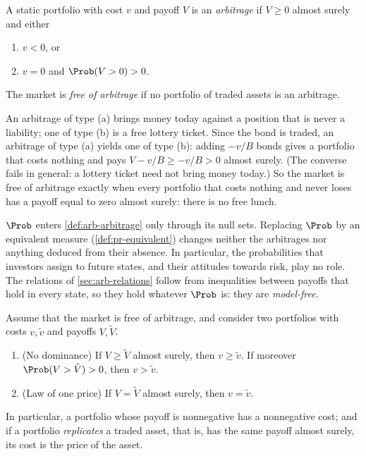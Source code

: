 \begin{definition}[Arbitrage]\label{def:arb-arbitrage}
A static portfolio with cost $v$ and payoff $V$ is an \emph{arbitrage} if $V\ge0$ almost
surely and either
\begin{enumerate}[label=(\alph*)]
  \item $v<0$, or
  \item $v=0$ and $\Prob(V>0)>0$.
\end{enumerate}
The market is \emph{free of arbitrage} if no portfolio of traded assets is an arbitrage.
\end{definition}

An arbitrage of type (a) brings money today against a position that is never a liability;
one of type (b) is a free lottery ticket. Since the bond is traded, an arbitrage of type (a)
yields one of type (b): adding $-v/B$ bonds gives a portfolio that costs nothing and pays
$V-v/B\ge-v/B>0$ almost surely. (The converse fails in general: a lottery ticket need not
bring money today.) So the market is free of arbitrage exactly when every portfolio that
costs nothing and never loses has a payoff equal to zero almost surely: there is no free
lunch.

\begin{remark}\label{rem:arb-model-free}
$\Prob$ enters \cref{def:arb-arbitrage} only through its null sets. Replacing $\Prob$ by an
equivalent measure (\cref{def:pr-equivalent}) changes neither the arbitrages nor anything
deduced from their absence. In particular, the probabilities that investors assign to
future states, and their attitudes towards risk, play no role. The relations of
\cref{sec:arb-relations} follow from inequalities between payoffs that hold in every state,
so they hold whatever $\Prob$ is: they are \emph{model-free}.
\end{remark}

\begin{proposition}\label{prop:arb-dominance}
Assume that the market is free of arbitrage, and consider two portfolios with costs
$v,\tilde v$ and payoffs $V,\tilde V$.
\begin{enumerate}[label=(\roman*)]
  \item (No dominance) If $V\ge\tilde V$ almost surely, then $v\ge\tilde v$. If moreover
    $\Prob(V>\tilde V)>0$, then $v>\tilde v$.
  \item (Law of one price) If $V=\tilde V$ almost surely, then $v=\tilde v$.
\end{enumerate}
In particular, a portfolio whose payoff is nonnegative has a nonnegative cost; and if a
portfolio \emph{replicates} a traded asset, that is, has the same payoff almost surely, its
cost is the price of the asset.
\end{proposition}

